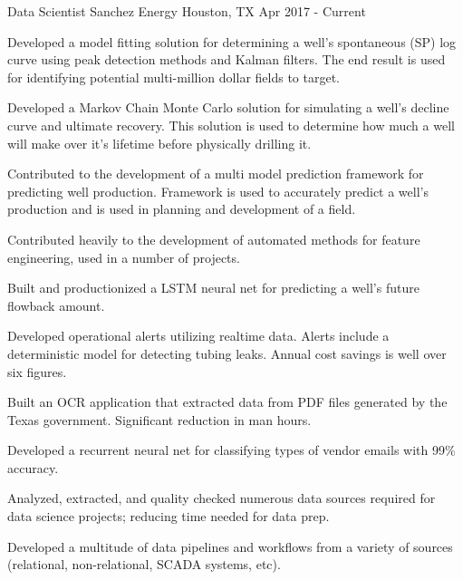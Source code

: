 


\begin{cventries}


\cventry
{Data Scientist} %
{Sanchez Energy} %
{Houston, TX} %
{Apr 2017 - Current} %
{ %
\begin{cvitems}
\item {Developed a model fitting solution for determining a well's spontaneous (SP) log curve using peak detection methods and Kalman filters.
        The end result is used for identifying potential multi-million dollar fields to target.}
\item {Developed a Markov Chain Monte Carlo solution for simulating a well's decline curve and ultimate recovery.
        This solution is used to determine how much a well will make over it's lifetime before physically drilling it.}
\item {Contributed to the development of a multi model prediction framework for predicting well production. 
        Framework is used to accurately predict a well's production and is used in planning and development of a field.}
\item {Contributed heavily to the development of automated methods for feature engineering, used in a number of projects.}
\item {Built and productionized a LSTM neural net for predicting a well's future flowback amount.}
\item {Developed operational alerts utilizing realtime data. Alerts include a deterministic model for detecting tubing leaks. 
        Annual cost savings is well over six figures.}
\item {Built an OCR application that extracted data from PDF files generated by the Texas government. Significant reduction in man hours.}
\item {Developed a recurrent neural net for classifying types of vendor emails with 99\% accuracy.}
\item {Analyzed, extracted, and quality checked numerous data sources required for data science projects; reducing time needed for data prep.}
\item {Developed a multitude of data pipelines and workflows from a variety of sources (relational, non-relational, SCADA systems, etc).}
\end{cvitems}
}


\end{cventries}
